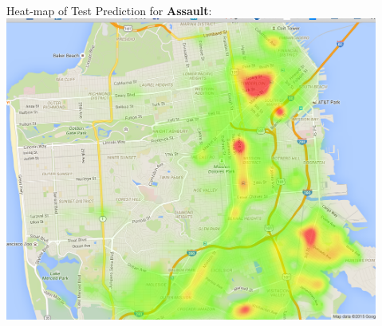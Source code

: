 \documentclass[12pt]{article}
\newenvironment{p4}[2][Part V Results and Evaluation]{\begin{trivlist}
\item[\hskip \labelsep {\bfseries #1}\hskip \labelsep {\bfseries #2}]}{\end{trivlist}}
\begin{document}
\begin{p4}{}
\begin{center}
\\
Heat-map of Test Prediction for \textbf{Assault}:\\
\includegraphics[height=10cm]{ASSAULT_test.png}
\end{center}
\end{p4}
\end{document}
